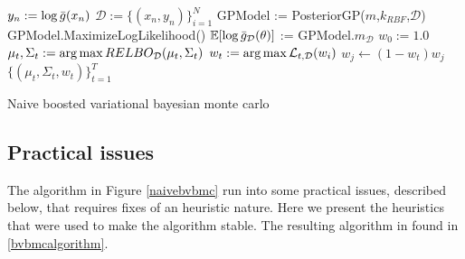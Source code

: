 \begin{Algorithm}
\begin{algorithmic}[1]
	\State $y_n := \log {\bar{g}}(x_n)$
	\EndFor
	\State $\mathcal{D} := \{(x_n,y_n)\}_{i=1}^N$
	\State GPModel := PosteriorGP($m$,$k_{RBF}$,$\mathcal{D}$)
	\State GPModel.MaximizeLogLikelihood() 
	\State ${\mathbb E}[\log {\bar{g}}_\mathcal{D}(\theta)]$ := GPModel.$m_\mathcal{D}$
	\State $w_0 := 1.0$
	\State $\mu_{t},\Sigma_{t} := \operatorname*{arg\,max} RELBO_\mathcal{D}(\mu_{t},\Sigma_{t})$
	\State $w_{t} := \operatorname*{arg\,max} \mathcal{L}_{t,\mathcal{D}}(w_i)$ 
	\State $w_{j} \gets (1-w_t)w_j$
	\EndFor
	\EndFor
	\State \Return $\{(\mu_t,\Sigma_t,w_t)\}_{t=1}^T$
	\EndProcedure
\end{algorithmic}
\caption{\label{naivebvbmc} Naive boosted variational bayesian monte carlo}
\end{Algorithm}
\subsection{Practical issues}
The algorithm in Figure \ref{naivebvbmc} run into some practical issues, described below, that requires fixes of an heuristic nature. Here we present the heuristics that were used to make the algorithm stable. The resulting algorithm in found in \ref{bvbmcalgorithm}.

